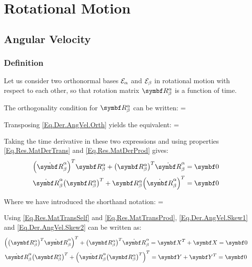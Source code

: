 \chapter{Rotational Motion}
\section{Angular Velocity} %
\subsection{Definition} %
Let us consider two orthonormal bases $\basis[\alpha]$ and $\basis[\beta]$ in rotational motion with respect to each other, so that rotation matrix $\RotM{\alpha}{\beta}$ is a function of time.

The orthogonality condition for $\RotM{\alpha}{\beta}$ can be written:
{
\trp{\RotM{\alpha}{\beta}} \RotM{\alpha}{\beta} = \IdM
}

Transposing \eqref{Eq.Der.AngVel.Orth} yields the equivalent:
{
\RotM{\alpha}{\beta} \trp{\RotM{\alpha}{\beta}} = \IdM
}

Taking the time derivative in these two expressions and using properties \eqref{Eq.Res.MatDerTrans} and \eqref{Eq.Res.MatDerProd} gives:
\begin{gather}
\trp{\RotMDot{\alpha}{\beta}} \RotM{\alpha}{\beta} + \trp{\RotM{\alpha}{\beta}} \RotMDot{\alpha}{\beta}=\NullM \label{Eq.Der.AngVel.Skew1}\\
\RotMDot{\alpha}{\beta} \trp{\RotM{\alpha}{\beta}} + \RotM{\alpha}{\beta} \trp{\RotMDot{\alpha}{\beta}}=\NullM \label{Eq.Der.AngVel.Skew2}
\end{gather}

Where we have introduced the shorthand notation:
\eqnl
{
\RotMDot{\alpha}{\beta} = 
}

Using \eqref{Eq.Res.MatTransSelf} and \eqref{Eq.Res.MatTransProd}, \eqref{Eq.Der.AngVel.Skew1} and \eqref{Eq.Der.AngVel.Skew2} can be written as:
\begin{gather}
\trp{\trp{\RotM{\alpha}{\beta}} \RotMDot{\alpha}{\beta}} + \trp{\RotM{\alpha}{\beta}} \RotMDot{\alpha}{\beta}=\tr{\mat{X}} + \mat{X} =\NullM \label{Eq.Der.AngVel.X}\\
\RotMDot{\alpha}{\beta} \trp{\RotM{\alpha}{\beta}} + \trp{\RotMDot{\alpha}{\beta} \trp{\RotM{\alpha}{\beta}}}=\mat{Y} + \tr{\mat{Y}} = \NullM \label{Eq.Der.AngVel.Y}
\end{gather}

